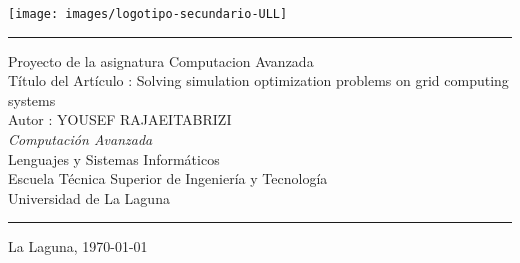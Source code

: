 \documentclass[spanish,a4paper,11pt,twoside]{report}
\begin{document}

\pagestyle{empty}
\thispagestyle{empty}


\newcommand{\HRule}{\rule{\linewidth}{1mm}}
\setlength{\parindent}{0mm}
\setlength{\parskip}{0mm}

\begin{center}
\texttt{[image: images/logotipo-secundario-ULL]}\\[0.25cm]
\end{center}

\HRule
\begin{center}
        {\Huge Proyecto de la asignatura Computacion Avanzada } \\[2.5mm] 
        {\Huge Título del Artículo :   Solving simulation optimization problems on grid computing systems
} \\[5mm]

        {\Large Autor : YOUSEF RAJAEITABRIZI} \\[10mm]

        {\em Computación Avanzada} \\[5mm]
        Lenguajes y Sistemas Informáticos \\[5mm]
        Escuela Técnica Superior de Ingeniería y Tecnología \\[5mm]
        
        Universidad de La Laguna \\
\end{center}
\HRule
{}
\begin{center}
  La Laguna, \today 
\end{center}
\end{document}
